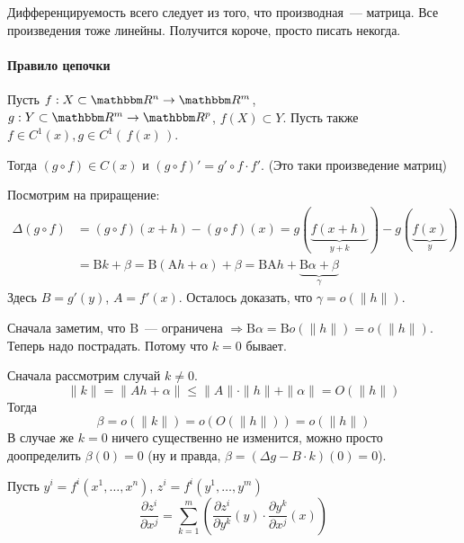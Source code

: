 \documentclass[12pt]{../../notes}
\begin{document}
\begin{itlproof}
  Дифференцируемость всего следует из того, что производная~--- матрица.
  Все произведения тоже линейны. Получится короче, просто писать некогда.
\end{itlproof}

\paragraph{Правило цепочки}

\begin{thrm}\label{stat:diffsuperpRn}
  Пусть $f : X \subset \R^n \to \R^m$, $g : Y \subset \R^m \to \R^p$, $f(X) \subset Y$.
  Пусть также $f \in C^1(x), g \in C^1(\,f(x)\,)$. 

  Тогда $(g \circ f) \in C(x)$ и $(g\circ f)' = g'\circ f \cdot f'$. (Это таки произведение матриц)
\end{thrm}

\begin{ittproof}
  Посмотрим на приращение:
  \[
    \begin{split}
      \Delta (g \circ f) &= (g \circ f)(x+h) - (g \circ f)(x) = g(\underbrace{f(x+h)}_{y+k}) - g(\underbrace{f(x)}_{y}) \\ 
          &= \mathrm{B} k + \beta = \mathrm{B}(\mathrm{A} h + \alpha ) + \beta 
          = \mathrm{B}\mathrm{A} h + \underbrace{\mathrm{B} \alpha + \beta}_\gamma
    \end{split}
  \]
  Здесь $B = g'(y)$, $A = f'(x)$.
  Осталось доказать, что $\gamma = o(\|h\|)$. 

  Сначала заметим, что $\mathrm{B}$~--- ограничена $\Rightarrow \mathrm{B} \alpha = \mathrm{B} o(\|h\|) = o(\|h\|)$.
  Теперь надо пострадать. Потому что $k = 0$ бывает.

  Сначала рассмотрим случай $k \neq 0$.
  \[
    \| k \| = \| A h + \alpha \| \leqslant \|A\| \cdot \|h\| + \|\alpha\| = O(\|h\|) 
  \]
  Тогда
  \[
    \beta = o(\|k\|) = o(O(\|h\|)) = o(\|h\|)
  \]
  В случае же $k = 0$ ничего существенно не изменится, можно просто доопределить $\beta(0) = 0$ 
  (ну и правда, $\beta = (\Delta g - B\cdot k)(0) = 0$).
\end{ittproof}

\begin{imp}\label{stat:chainrule}
  Пусть $y^i = f^i(x^1, \dotsc, x^n)$, $z^i = f^i(y^1, \dotsc, y^m)$
  \[
    \frac{\partial z^i}{\partial x^j} = \sum_{k=1}^{m} \left( \frac{\partial z^i}{\partial y^k}(y) 
        \cdot \frac{\partial y^k}{\partial x^j}(x) \right)
  \]
\end{imp}
\end{document}
